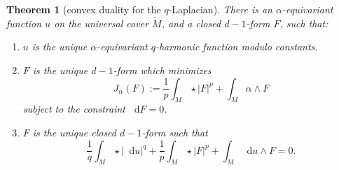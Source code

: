 \documentclass[reqno,11pt]{amsart}
\newcommand*\dif{\mathop{}\!\mathrm{d}}
\newtheorem{theorem}{Theorem}[section]
\theoremstyle{definition}
\numberwithin{equation}{section}
\begin{document}
\begin{theorem}[convex duality for the $q$-Laplacian]\label{mfmc qLaplacian}
There is an $\alpha$-equivariant function $u$ on the universal cover $\tilde M$, and a closed $d - 1$-form $F$, such that:
\begin{enumerate}
\item $u$ is the unique $\alpha$-equivariant $q$-harmonic function modulo constants.
\item $F$ is the unique $d - 1$-form which minimizes
$$J_\alpha(F) := \frac{1}{p} \int_M \star |F|^p + \int_M \alpha \wedge F$$
subject to the constraint $\dif F = 0$.
\item $F$ is the unique closed $d - 1$-form such that
\begin{equation}\label{strong duality appendix}
	\frac{1}{q} \int_M \star |\dif u|^q + \frac{1}{p} \int_M \star |F|^p + \int_M \dif u \wedge F = 0.
\end{equation}
\end{enumerate}
\end{theorem}
\end{document}
